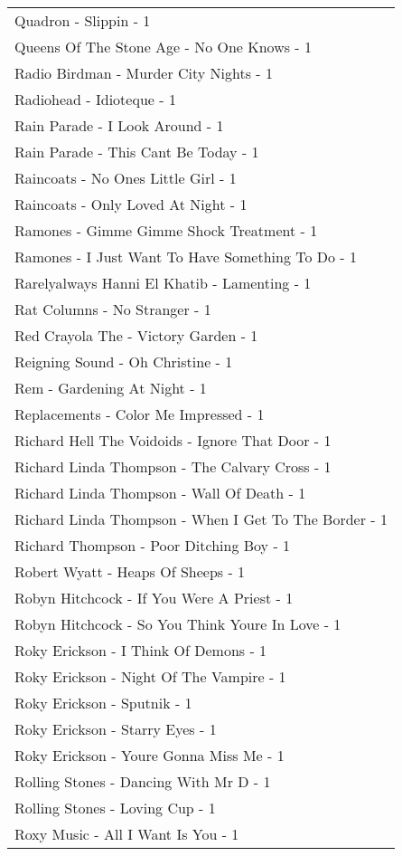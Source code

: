 \documentclass[
]{article}
\begin{document}
\begin{longtable}{l}
Quadron - Slippin - 1 \\ 
Queens Of The Stone Age - No One Knows - 1 \\ 
Radio Birdman - Murder City Nights - 1 \\ 
Radiohead - Idioteque - 1 \\ 
Rain Parade - I Look Around - 1 \\ 
Rain Parade - This Cant Be Today - 1 \\ 
Raincoats - No Ones Little Girl - 1 \\ 
Raincoats - Only Loved At Night - 1 \\ 
Ramones - Gimme Gimme Shock Treatment - 1 \\ 
Ramones - I Just Want To Have Something To Do - 1 \\ 
Rarelyalways Hanni El Khatib - Lamenting - 1 \\ 
Rat Columns - No Stranger - 1 \\ 
Red Crayola The - Victory Garden - 1 \\ 
Reigning Sound - Oh Christine - 1 \\ 
Rem - Gardening At Night - 1 \\ 
Replacements - Color Me Impressed - 1 \\ 
Richard Hell The Voidoids - Ignore That Door - 1 \\ 
Richard Linda Thompson - The Calvary Cross - 1 \\ 
Richard Linda Thompson - Wall Of Death - 1 \\ 
Richard Linda Thompson - When I Get To The Border - 1 \\ 
Richard Thompson - Poor Ditching Boy - 1 \\ 
Robert Wyatt - Heaps Of Sheeps - 1 \\ 
Robyn Hitchcock - If You Were A Priest - 1 \\ 
Robyn Hitchcock - So You Think Youre In Love - 1 \\ 
Roky Erickson - I Think Of Demons - 1 \\ 
Roky Erickson - Night Of The Vampire - 1 \\ 
Roky Erickson - Sputnik - 1 \\ 
Roky Erickson - Starry Eyes - 1 \\ 
Roky Erickson - Youre Gonna Miss Me - 1 \\ 
Rolling Stones - Dancing With Mr D - 1 \\ 
Rolling Stones - Loving Cup - 1 \\ 
Roxy Music - All I Want Is You - 1 \\ 

\end{longtable}
\end{document}
